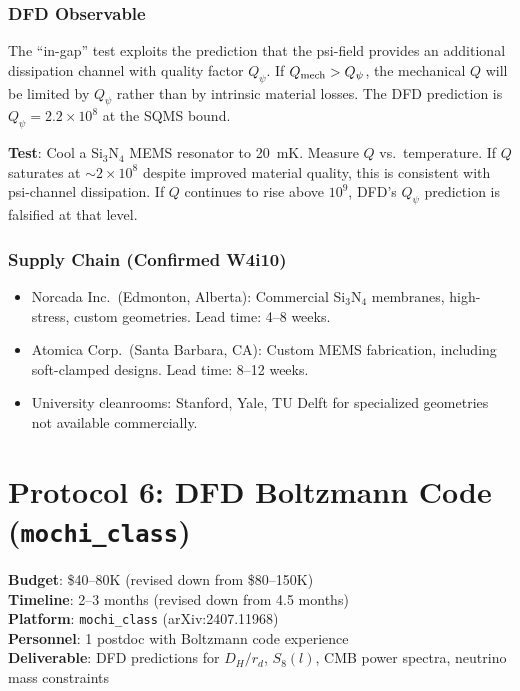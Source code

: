 \documentclass[11pt]{article}
\newcommand{\ee}[1]{\times 10^{#1}}
\newcommand{\Qpsi}{Q_\psi}
\begin{document}
\section{DFD Observable}

The ``in-gap'' test exploits the prediction that the psi-field provides
an additional dissipation channel with quality factor $\Qpsi$. If
$Q_{\rm mech} > \Qpsi$, the mechanical $Q$ will be limited by
$\Qpsi$ rather than by intrinsic material losses. The DFD prediction
is $\Qpsi = 2.2\ee{8}$ at the SQMS bound.

\textbf{Test}: Cool a Si$_3$N$_4$ MEMS resonator to 20~mK.
Measure $Q$ vs.\ temperature. If $Q$ saturates at $\sim 2\ee{8}$
despite improved material quality, this is consistent with
psi-channel dissipation. If $Q$ continues to rise above $10^9$,
DFD's $\Qpsi$ prediction is falsified at that level.

\section{Supply Chain (Confirmed W4i10)}

\begin{itemize}[nosep]
\item Norcada Inc.\ (Edmonton, Alberta): Commercial Si$_3$N$_4$ membranes,
  high-stress, custom geometries. Lead time: 4--8 weeks.
\item Atomica Corp.\ (Santa Barbara, CA): Custom MEMS fabrication,
  including soft-clamped designs. Lead time: 8--12 weeks.
\item University cleanrooms: Stanford, Yale, TU Delft for
  specialized geometries not available commercially.
\end{itemize}


\part{Protocol 6: DFD Boltzmann Code (\texttt{mochi\_class})}
\label{part:boltzmann}

\begin{tcolorbox}[colback=red!5!white, colframe=warncolor,
  title=\textbf{URGENT: DFD BOLTZMANN CODE --- REVISED USING \texttt{mochi\_class}}]
\textbf{Budget}: \$40--80K (revised down from \$80--150K)\\
\textbf{Timeline}: 2--3 months (revised down from 4.5 months)\\
\textbf{Platform}: \texttt{mochi\_class} (arXiv:2407.11968)\\
\textbf{Personnel}: 1 postdoc with Boltzmann code experience\\
\textbf{Deliverable}: DFD predictions for $D_H/r_d$, $S_8(l)$,
  CMB power spectra, neutrino mass constraints
\end{tcolorbox}
\end{document}

